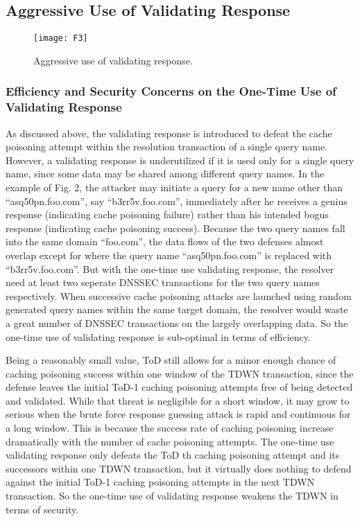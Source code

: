\documentclass[conference]{IEEEtran}
\begin{document}
\subsection{Aggressive Use of Validating Response}

\begin{figure}[!t]
\centering
{\texttt{[image: F3]}}
\caption{Aggressive use of validating response.}
\vspace{-2em}
\end{figure}

\subsubsection{Efficiency and Security Concerns on the One-Time Use of Validating Response}

As discussed above, the validating response is introduced to defeat the cache poisoning attempt within the resolution transaction of a single query name. However, a validating response is underutilized if it is used only for a single query name, since some data may be shared among different query names. In the example of Fig. 2, the attacker may initiate a query for a new name other than ``asq50pn.foo.com'', say ``b3rr5v.foo.com'', immediately after he receives a genius response (indicating cache poisoning failure) rather than his intended bogus response (indicating cache poisoning success). Because the two query names fall into the same domain ``foo.com'', the data flows of the two defenses almost overlap except for where the query name ``asq50pn.foo.com'' is replaced with ``b3rr5v.foo.com''. But with the one-time use validating response, the resolver need at least two seperate DNSSEC transactions for the two query names respectively. When successive cache poisoning attacks are launched using random generated query names within the same target domain, the resolver would waste a great number of DNSSEC transactions on the largely overlapping data. So the one-time use of validating response is sub-optimal in terms of efficiency.


Being a reasonably small value, ToD still allows for a minor enough chance of caching poisoning success within one window of the TDWN transaction, since the defense leaves the initial ToD-1 caching poisoning attempts free of being detected and validated. While that threat is negligible for a short window, it may grow to serious when the brute force response guessing attack is rapid and continuous for a long window. This is because the success rate of caching poisoning increase dramatically with the number of cache poisoning attempts. The one-time use validating response only defeats the ToD th caching poisoning attempt and its successors within one TDWN transaction, but it virtually does nothing to defend against the initial ToD-1 caching poisoning attempts in the next TDWN transaction. So the one-time use of validating response weakens the TDWN in terms of security.
\end{document}
